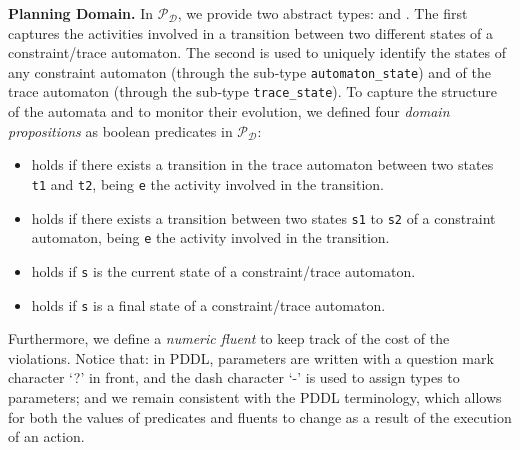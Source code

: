 \medskip
\noindent
\textbf{Planning Domain.}
%
In $\mathcal{P_D}$, we provide two abstract types:  and .
%
The first captures the activities involved in a transition between two different states of a constraint/trace automaton.
%
The second is used to uniquely identify the states of any constraint automaton (through the sub-type \texttt{automaton\_state}) and of the trace automaton (through the sub-type \texttt{trace\_state}).
%
To capture the structure of the automata and to monitor their evolution, we defined four \emph{domain propositions} as boolean predicates in $\mathcal{P_D}$:
%
\begin{itemize}
	\item {} holds if there exists a transition in the trace automaton between two states \texttt{t1} and \texttt{t2}, being \texttt{e} the activity involved in the transition.
	\item {} holds if there exists a transition between two states \texttt{s1} to \texttt{s2} of a constraint automaton, being \texttt{e} the activity involved in the transition.
	\item {} holds if \texttt{s} is the current state of a constraint/trace automaton.
	\item {} holds if \texttt{s} is a final state of a constraint/trace automaton.
\end{itemize}
Furthermore, we define a \emph{numeric fluent}  to keep track of the cost of the violations. Notice that: \myi in PDDL, parameters are written with a question mark character `?' in front, and the dash character `-' is used to assign types to parameters; and \myii we remain consistent with the PDDL terminology, which allows for both the values of predicates and fluents to change as a result of the execution of an action.
%

